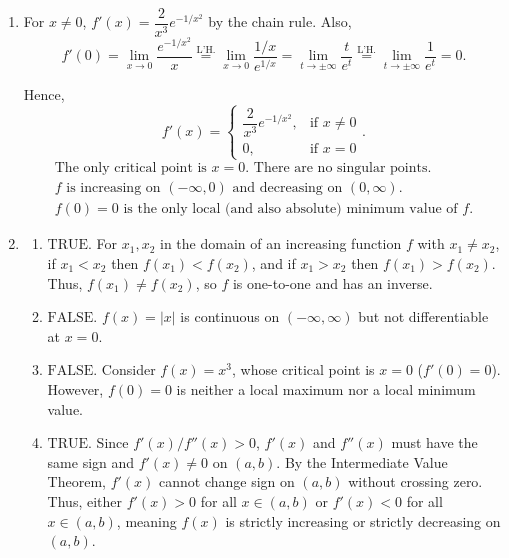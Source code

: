 \documentclass[a4paper, 12pt]{article}
\renewcommand{\headrulewidth}{0pt}
\begin{document}
\newpage
\pagestyle{fancy}
\renewcommand{\headrulewidth}{1pt}


\begin{enumerate}[leftmargin=*,label=\textbf{\arabic*.}]
\item For $x \ne 0$, $f'(x) = \dfrac{2}{x^3} e^{-1/x^2}$ by the chain rule. Also,
\[f'(0) = \lim_{x \to 0} \frac{e^{-1/x^2}}{x} \overset{\text{L'H.}}{=} \lim_{x\to0}\frac{1/x}{e^{1/x}}=\lim_{t\to\pm\infty}\frac t{e^t}\overset{\text{L'H.}}{=}\lim_{t\to\pm\infty}\frac1{e^t}=0.\]

Hence,
\[f'(x) = \begin{cases} \dfrac{2}{x^3} e^{-1/x^2}, & \text{if } x \ne 0 \\ 0, & \text{if } x = 0 \end{cases}.\]
\[\boxed{
\begin{gathered}
\text{The only critical point is } x=0. \text{ There are no singular points.}\\
f\text{ is increasing on }(-\infty,0)\text{ and decreasing on }(0,\infty).\\
f(0)=0\text{ is the only local (and also absolute) minimum value of }f.
\end{gathered}
}\]

\item 
\begin{enumerate}[leftmargin=*,label=\textbf{\alph*.}]
\item $\boxed{\text{TRUE.}}$ For $x_1, x_2$ in the domain of an increasing function $f$ with $x_1 \ne x_2$, if \linebreak $x_1 < x_2$ then $f(x_1) < f(x_2)$, and if $x_1 > x_2$ then $f(x_1) > f(x_2)$. Thus, $f(x_1) \ne f(x_2)$, so $f$ is one-to-one and has an inverse.

\item $\boxed{\text{FALSE.}}$ $f(x) = |x|$ is continuous on $(-\infty, \infty)$ but not differentiable at $x = 0$.

\item $\boxed{\text{FALSE.}}$ Consider $f(x) = x^3$, whose critical point is $x = 0$ ($f'(0) = 0$). However, $f(0) = 0$ is neither a local maximum nor a local minimum value.

\item $\boxed{\text{TRUE.}}$ Since $f'(x)/f''(x) > 0$, $f'(x)$ and $f''(x)$ must have the same sign and $f'(x) \ne 0$ on $(a, b)$. By the Intermediate Value Theorem, $f'(x)$ cannot change sign on $(a, b)$ without crossing zero. Thus, either $f'(x) > 0$ for all $x \in (a, b)$ or $f'(x) < 0$ for all $x \in (a, b)$, meaning $f(x)$ is strictly increasing or strictly decreasing on $(a, b)$.
\end{enumerate}


\end{enumerate}
\end{document}
